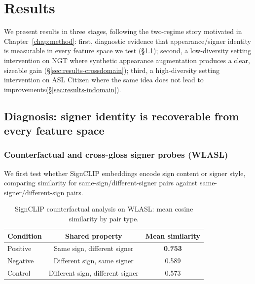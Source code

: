 \chapter{Results}
\label{chap:results}

We present results in three stages, following the two-regime story
motivated in Chapter~\ref{chap:method}: first, diagnostic evidence that
appearance/signer identity is measurable in every feature space we test
(\S\ref{sec:results-diagnosis}); second, a low-diversity setting
intervention on NGT where synthetic appearance augmentation produces a
clear, sizeable gain (\S\ref{sec:results-crossdomain}); third, a high-diversity setting
intervention on ASL Citizen where the same idea does not lead to improvements(\S\ref{sec:results-indomain}).

\section{Diagnosis: signer identity is recoverable from every feature space}
\label{sec:results-diagnosis}

\subsection{Counterfactual and cross-gloss signer probes (WLASL)}
We first test whether SignCLIP embeddings encode sign content or signer
style, comparing similarity for same-sign/different-signer pairs against
same-signer/different-sign pairs.

\begin{table}[t]
\centering\small
\begin{tabular}{lcc}
\hline
Condition & Shared property & Mean similarity \\
\hline
Positive & Same sign, different signer & \textbf{0.753} \\
Negative & Different sign, same signer & 0.589 \\
Control  & Different sign, different signer & 0.573 \\
\hline
\end{tabular}
\caption{SignCLIP counterfactual analysis on WLASL: mean cosine similarity
by pair type.}
\label{tab:wlasl_counterfactual}
\end{table}

